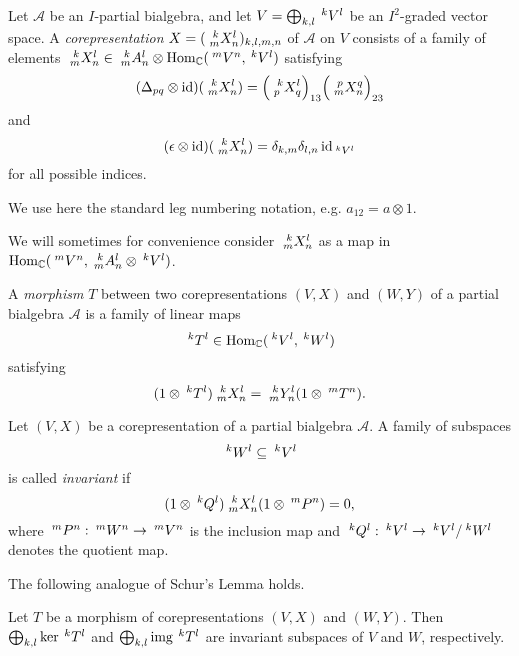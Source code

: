 \begin{Def} Let $\mathscr{A}$ be an $I$-partial bialgebra, and let $V=\bigoplus_{k,l} \Gru{V}{k}{l}$ be an $I^{2}$-graded vector space.
A \emph{corepresentation}  $X=(\Gr{X}{k}{l}{m}{n})_{k,l,m,n}$ of $\mathscr{A}$ on $V$ consists of a family of elements 
  $\Gr{X}{k}{l}{m}{n} \in \Gr{A}{k}{l}{m}{n} \otimes
  \Hom_\C(\Gru{V}{m}{n},\Gru{V}{k}{l})$
  satisfying
  \begin{align} \label{eq:rep-delta1}
    (\Delta_{pq} \otimes \id)(\Gr{X}{k}{l}{m}{n}) =
    \Big{(}\Gr{X}{k}{l}{p}{q}\Big{)}_{13}\Big{(}\Gr{X}{p}{q}{m}{n}\Big{)}_{23}
  \end{align}
and   \[(\epsilon \otimes
    \id)(\Gr{X}{k}{l}{m}{n})=\delta_{k,m}\delta_{l,n}\id_{\Gru{V}{k}{l}}\] 
for all possible indices.
\end{Def} %

We use here the standard leg numbering notation, e.g. $a_{12} = a\otimes 1$.

We will sometimes for convenience consider $\Gr{X}{k}{l}{m}{n}$ as a map in $\Hom_\C(\Gru{V}{m}{n},\Gr{A}{k}{l}{m}{n}\otimes \Gru{V}{k}{l})$. %

\begin{Def}\label{DefMorphism} A \emph{morphism} $T$ between two corepresentations
$(V,X)$ and $(W,Y)$ of a partial bialgebra $\mathscr{A}$ is a family of linear maps
\[\Gru{T}{k}{l} \in
\Hom_\C(\Gru{V}{k}{l},\Gru{W}{k}{l})\]
satisfying \[(1 \otimes \Gru{T}{k}{l})\Gr{X}{k}{l}{m}{n} = \Gr{Y}{k}{l}{m}{n}(1 \otimes \Gru{T}{m}{n}).\]
\end{Def}

\begin{Def} Let $(V,X)$ be a
corepresentation of a partial bialgebra $\mathscr{A}$. A family of subspaces
\[\Gru{W}{k}{l} \subseteq \Gru{V}{k}{l}\]
is called \emph{invariant} if \[(1\otimes \Gru{Q}{k}{l})\Gr{X}{k}{l}{m}{n}(1 \otimes \Gru{P}{m}{n}) =0,\]
where $\Gru{P}{m}{n}:\Gru{W}{m}{n}\to\Gru{V}{m}{n}$ is the inclusion map and $\Gru{Q}{k}{l}:\Gru{V}{k}{l}\to\Gru{V}{k}{l}/\Gru{W}{k}{l}$
denotes the quotient map.
\end{Def}

The following analogue of Schur's Lemma holds.

\begin{Lem} Let $T$ be a morphism
of corepresentations $(V,X)$ and
$(W,Y)$. Then $ \bigoplus_{k,l} \ker \Gru{T}{k}{l}$ and
$\bigoplus_{k,l} \img \Gru{T}{k}{l}$ are invariant subspaces of
$V$ and $W$, respectively.
\end{Lem} 

